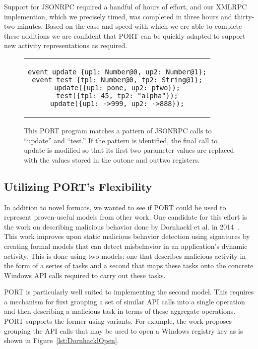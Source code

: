 Support for JSONRPC required a handful of hours of effort, and our
XMLRPC implemention,
which we precisely timed, was completed in three
hours and thirty-two minutes.  Based on the ease and speed with which we
ere able to complete these additions we are confident that PORT can be
quickly adapted to support new activity representations as required.

\begin{figure}[H]
\centering
\begin{tabular}{c}
\begin{lstlisting}
event update {up1: Number@0, up2: Number@1};
event test {tp1: Number@0, tp2: String@1};
update({up1: pone, up2: ptwo});
test({tp1: 45, tp2: "alpha"});
update({up1: ->999, up2: ->888});
\end{lstlisting}
\end{tabular}
\caption{This PORT program matches a pattern of JSONRPC calls to
  ``update'' and ``test.''  If the pattern is identified, the final call to
  update is modified so that its first two parameter values are replaced
  with the values stored in the outone and outtwo registers.}
\label{lst:JSONProgram}
\end{figure}


\subsection{Utilizing PORT's Flexibility}
In addition to novel formats, we wanted to see if PORT could be used to
represent proven-useful models from other work.  One candidate for this
effort is the work on describing malicious behavior done by Dornhackl et
al. in 2014~\cite{Dornhackl2014}.  This work improves upon static malicious
behavior detection using signatures by creating formal models that can
detect misbehavior in an application's dynamic activity.  This is done
using two models: one that describes malicious activity in the form of a
series of tasks and a second that maps these tasks onto the concrete
Windows API calls required to carry out these tasks.

PORT is particularly well suited to implementing the second model.  This
requires a mechanism for first grouping a set of similar API calls
into a single operation and then describing a malicious task in terms of
these aggregate operations.  PORT supports the former using variants.
For example, the work proposes grouping the API calls that may be used to
open a Windows registry key as is shown in Figure~\ref{lst:DornhacklOpen}.

